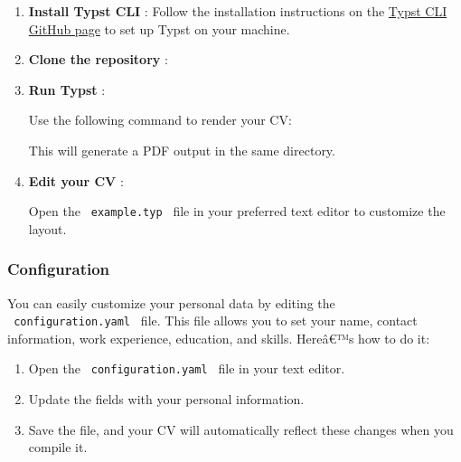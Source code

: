 \begin{enumerate}
\item
  \textbf{Install Typst CLI} : Follow the installation instructions on
  the \href{https://github.com/typst/typst\#installation}{Typst CLI
  GitHub page} to set up Typst on your machine.
\item
  \textbf{Clone the repository} :

\begin{Shaded}
\begin{Highlighting}[]
\end{Highlighting}
\end{Shaded}
\item
  \textbf{Run Typst} :

  Use the following command to render your CV:

\begin{Shaded}
\begin{Highlighting}[]
\end{Highlighting}
\end{Shaded}

  This will generate a PDF output in the same directory.
\item
  \textbf{Edit your CV} :

  Open the \texttt{\ example.typ\ } file in your preferred text editor
  to customize the layout.
\end{enumerate}

\subsubsection{Configuration}\label{configuration}

You can easily customize your personal data by editing the
\texttt{\ configuration.yaml\ } file. This file allows you to set your
name, contact information, work experience, education, and skills.
Hereâ€™s how to do it:

\begin{enumerate}
\tightlist
\item
  Open the \texttt{\ configuration.yaml\ } file in your text editor.
\item
  Update the fields with your personal information.
\item
  Save the file, and your CV will automatically reflect these changes
  when you compile it.
\end{enumerate}

